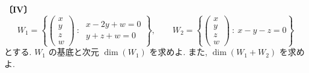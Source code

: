 \noindent\textbf{〔IV〕}
\[
W_1=\left\{\begin{pmatrix}x\\y\\z\\w\end{pmatrix}\ :\
\begin{array}{l}x-2y+w=0\\ y+z+w=0\end{array}\right\},\qquad
W_2=\left\{\begin{pmatrix}x\\y\\z\\w\end{pmatrix}\ :\ x-y-z=0\right\}
\]
とする. $W_1$ の基底と次元 $\dim(W_1)$ を求めよ. また, $\dim(W_1+W_2)$ を求めよ.
